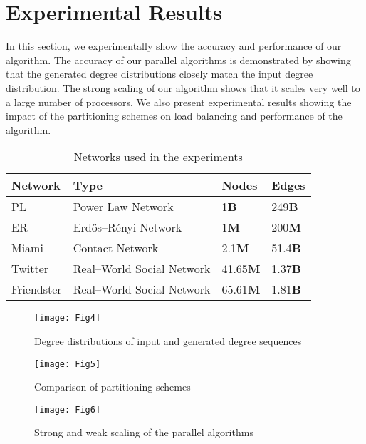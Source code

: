 \documentclass[conference,letterpaper,10pt]{IEEEtran}
\begin{document}
\section{Experimental Results}
\label{Section:PCL:exp}
In this section, we experimentally show the accuracy and performance of our algorithm. The accuracy of our parallel algorithms is demonstrated by showing that the generated degree distributions closely match the input degree distribution. The strong scaling of our algorithm shows that it scales very well to a large number of processors. We also present experimental results showing the impact of the partitioning schemes on load balancing and performance of the algorithm.

\begin{table*}[t]
\caption{Networks used in the experiments}
\label{Table:Networks}
\centering
\begin{tabular}{|l|l|l|l|}
\hline
Network  & Type & Nodes & Edges \\ 
\hline
PL & Power Law Network &  1\textbf{B} & 249\textbf{B}\\
ER &  Erd\H{o}s--R\'enyi Network &  1\textbf{M} & 200\textbf{M}\\
Miami \cite{Barrett2009} &  Contact Network &  2.1\textbf{M} & 51.4\textbf{B}\\
Twitter \cite{Yang2011} &  Real--World Social Network &  41.65\textbf{M} & 1.37\textbf{B}\\
Friendster \cite{Yang2012} &  Real--World Social Network &  65.61\textbf{M} & 1.81\textbf{B}\\
\hline
\end{tabular}
\end{table*}

\begin{figure*}[t]
\centering
{\texttt{[image: Fig4]}}
\caption{Degree distributions of input and generated degree sequences}
\label{Figure:PCL:DegreeDistributions}
\end{figure*}

\begin{figure*}[t]
\centering
{\texttt{[image: Fig5]}}
\caption{Comparison of partitioning schemes}
\label{Figure:PCL:PartitioningSchemes}
\end{figure*}

\begin{figure*}[t]
\centering
{\texttt{[image: Fig6]}}
\caption{Strong and weak scaling of the parallel algorithms}
\label{Figure:PCL:cl-strongscaling}
\end{figure*}
\end{document}

